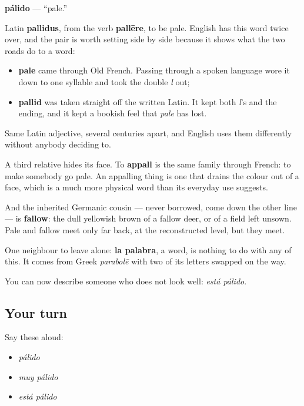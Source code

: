 \begin{cousinweb}
\textbf{pálido} — \textquotedblleft{}pale.\textquotedblright{}

Latin \textbf{pallidus}, from the verb \textbf{pallēre}, to be pale. English has this word twice over, and the pair is worth setting side by side because it shows what the two roads do to a word:

\begin{itemize}
\raggedright
  \item \textbf{pale} came through Old French. Passing through a spoken language wore it down to one syllable and took the double \emph{l} out;
  \item \textbf{pallid} was taken straight off the written Latin. It kept both \emph{l}'s and the ending, and it kept a bookish feel that \emph{pale} has lost.
\end{itemize}

Same Latin adjective, several centuries apart, and English uses them differently without anybody deciding to.

A third relative hides its face. To \textbf{appall} is the same family through French: to make somebody go pale. An appalling thing is one that drains the colour out of a face, which is a much more physical word than its everyday use suggests.

And the inherited Germanic cousin — never borrowed, come down the other line — is \textbf{fallow}: the dull yellowish brown of a fallow deer, or of a field left unsown. Pale and fallow meet only far back, at the reconstructed level, but they meet.

One neighbour to leave alone: \textbf{la palabra}, a word, is nothing to do with any of this. It comes from Greek \emph{parabolē} with two of its letters swapped on the way.
\end{cousinweb}

\begin{grammarlens}[title={What you've built}]
You can now describe someone who does not look well: \emph{está pálido}.
\end{grammarlens}

\subsection*{Your turn}
Say these aloud:

\begin{itemize}
\raggedright
  \item \emph{pálido}
  \item \emph{muy pálido}
  \item \emph{está pálido}
\end{itemize}

